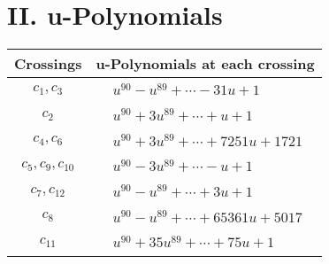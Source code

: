 \documentclass[1p]{elsarticle_modified}
\theoremstyle{definition}
\begin{document}
\newpage\renewcommand{\arraystretch}{1}
\centering \section*{ II. u-Polynomials}
\begin{tabular}{m{50pt}|m{274pt}}
Crossings & \hspace{64pt}u-Polynomials at each crossing \\
\hline $$\begin{aligned}c_{1},c_{3}\end{aligned}$$&$\begin{aligned}
&u^{90}- u^{89}+\cdots-31 u+1
\end{aligned}$\\
\hline $$\begin{aligned}c_{2}\end{aligned}$$&$\begin{aligned}
&u^{90}+3 u^{89}+\cdots+u+1
\end{aligned}$\\
\hline $$\begin{aligned}c_{4},c_{6}\end{aligned}$$&$\begin{aligned}
&u^{90}+3 u^{89}+\cdots+7251 u+1721
\end{aligned}$\\
\hline $$\begin{aligned}c_{5},c_{9},c_{10}\end{aligned}$$&$\begin{aligned}
&u^{90}-3 u^{89}+\cdots- u+1
\end{aligned}$\\
\hline $$\begin{aligned}c_{7},c_{12}\end{aligned}$$&$\begin{aligned}
&u^{90}- u^{89}+\cdots+3 u+1
\end{aligned}$\\
\hline $$\begin{aligned}c_{8}\end{aligned}$$&$\begin{aligned}
&u^{90}- u^{89}+\cdots+65361 u+5017
\end{aligned}$\\
\hline $$\begin{aligned}c_{11}\end{aligned}$$&$\begin{aligned}
&u^{90}+35 u^{89}+\cdots+75 u+1
\end{aligned}$\\
\hline
\end{tabular}\newpage\renewcommand{\arraystretch}{1}
\end{document}
